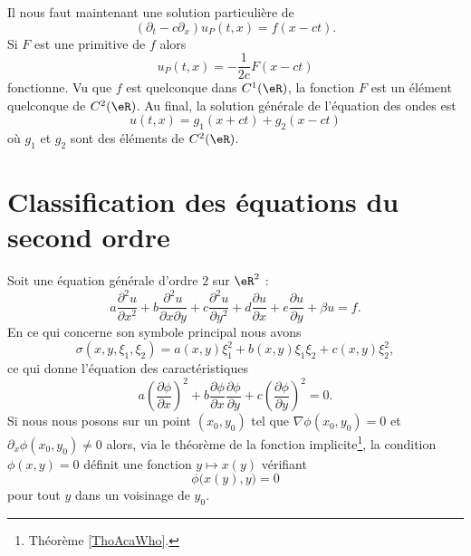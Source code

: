 Il nous faut maintenant une solution particulière de 
\begin{equation}
    (\partial_t-c\partial_x)u_P(t,x)=f(x-ct).
\end{equation}
Si \( F\) est une primitive de \( f\) alors 
\begin{equation}
    u_P(t,x)=-\frac{ 1 }{ 2c }F(x-ct)
\end{equation}
fonctionne. Vu que \( f\) est quelconque dans \( C^1(\eR)\), la fonction \( F\) est un élément quelconque de \( C^2(\eR)\). Au final, la solution générale de l'équation des ondes est
\begin{equation}
    u(t,x)=g_1(x+ct)+g_2(x-ct)
\end{equation}
où \( g_1\) et \( g_2\) sont des éléments de \( C^2(\eR)\).

\section{Classification des équations du second ordre}

Soit une équation générale d'ordre \( 2\) sur \( \eR^2\) :
\begin{equation}
    a\frac{ \partial^2 u }{ \partial x^2 }+b\frac{ \partial^2u }{ \partial x\partial y }+c\frac{ \partial^2u }{ \partial y^2 }+d\frac{ \partial u }{ \partial x }+e\frac{ \partial u }{ \partial y }+\beta u=f.
\end{equation}
En ce qui concerne son symbole principal nous avons
\begin{equation}
    \sigma(x,y,\xi_1,\xi_2)=a(x,y)\xi_1^2+b(x,y)\xi_1\xi_2+c(x,y)\xi_2^2,
\end{equation}
ce qui donne l'équation des caractéristiques
\begin{equation}        \label{EQooSAFNooEimPhO}
    a\left( \frac{ \partial \phi }{ \partial x } \right)^2+b\frac{ \partial \phi }{ \partial x }\frac{ \partial \phi }{ \partial y }+c\left( \frac{ \partial \phi }{ \partial y } \right)^2=0.
\end{equation}
Si nous nous posons sur un point \( (x_0,y_0)\) tel que \( \nabla\phi(x_0,y_0)=0\) et \( \partial_x\phi(x_0,y_0)\neq 0\) alors, via le théorème de la fonction implicite\footnote{Théorème \ref{ThoAcaWho}.}, la condition \( \phi(x,y)=0\) définit une fonction \( y\mapsto x(y)\) vérifiant
\begin{equation}
    \phi\big( x(y),y \big)=0
\end{equation}
pour tout \( y\) dans un voisinage de \( y_0\).

